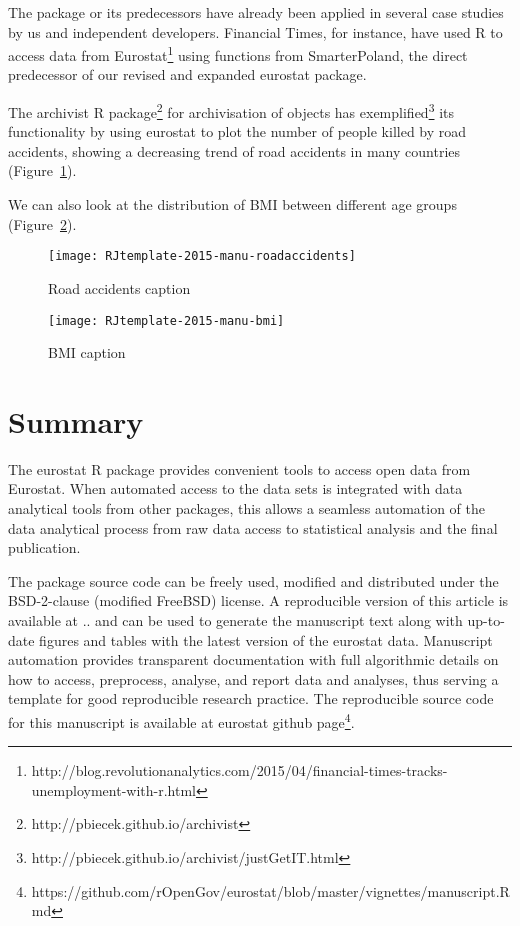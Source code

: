The package or its predecessors have already been applied in several case studies by us and independent developers. Financial Times, for instance, have used R to access data from Eurostat\footnote{http://blog.revolutionanalytics.com/2015/04/financial-times-tracks-unemployment-with-r.html} using functions from SmarterPoland, the direct predecessor of our revised and expanded eurostat package.

The archivist R package\footnote{http://pbiecek.github.io/archivist} for archivisation of objects has exemplified\footnote{http://pbiecek.github.io/archivist/justGetIT.html} its functionality by using eurostat to plot the number of people killed by road accidents, showing a decreasing trend of road accidents in many countries (Figure~\ref{fig:roadaccidents}).

We can also look at the distribution of BMI between different age groups (Figure~\ref{fig:bmi}).


\begin{figure}
\begin{center}
\texttt{[image: RJtemplate-2015-manu-roadaccidents]}
\end{center}
\caption{Road accidents caption}
\label{fig:roadaccidents}
\end{figure}


\begin{figure}
\begin{center}
\texttt{[image: RJtemplate-2015-manu-bmi]}
\end{center}
\caption{BMI caption}
\label{fig:bmi}
\end{figure}




\section{Summary}

The eurostat R package provides convenient tools to access open data
from Eurostat. When automated access to the data sets is integrated
with data analytical tools from other packages, this allows a seamless
automation of the data analytical process from raw data access to
statistical analysis and the final publication.

The package source code can be freely used, modified and distributed
under the BSD-2-clause (modified FreeBSD) license. A reproducible
version of this article is available at .. and can be used to generate
the manuscript text along with up-to-date figures and tables with the
latest version of the eurostat data. Manuscript automation provides
transparent documentation with full algorithmic details on how to
access, preprocess, analyse, and report data and analyses, thus
serving a template for good reproducible research practice. The reproducible source code for this manuscript is available at eurostat github page\footnote{https://github.com/rOpenGov/eurostat/blob/master/vignettes/manuscript.Rmd}.


